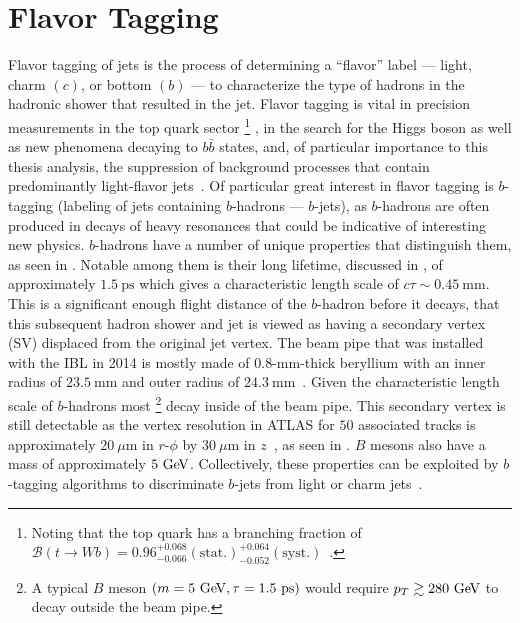 \clearpage
\section{Flavor Tagging}\label{section:flavor_tagging}

Flavor tagging of jets is the process of determining a ``flavor'' label --- light, charm $(c)$, or bottom $(b)$ --- to characterize the type of hadrons in the hadronic shower that resulted in the jet.
Flavor tagging is vital in precision measurements in the top quark sector%
\footnote{Noting that the top quark has a branching fraction of $\mathcal{B}\left(t \to W b\right) = 0.96_{-0.066}^{+0.068}\left(\mathrm{stat.}\right)_{-0.052}^{+0.064}\left(\mathrm{syst.}\right)$~\cite{Abazov:2010tm,PhysRevD.98.030001}.}%
, in the search for the Higgs boson as well as new phenomena decaying to $b\bar{b}$ states, and, of particular importance to this thesis analysis, the suppression of background processes that contain predominantly light-flavor jets~\cite{PERF-2012-04}.
Of particular great interest in flavor tagging is $b$-tagging (labeling of jets containing $b$-hadrons --- $b$-jets), as $b$-hadrons are often produced in decays of heavy resonances that could be indicative of interesting new physics.
$b$-hadrons have a number of unique properties that distinguish them, as seen in .
Notable among them is their long lifetime, discussed in , of approximately $1.5~\mathrm{ps}$ which gives a characteristic length scale of $c\tau \sim 0.45~\mathrm{mm}$.
This is a significant enough flight distance of the $b$-hadron before it decays, that this subsequent hadron shower and jet is viewed as having a secondary vertex (SV) displaced from the original jet vertex.
The beam pipe that was installed with the \gls{IBL} in 2014 is mostly made of $0.8$-mm-thick beryllium with an inner radius of $23.5~\mathrm{mm}$ and outer radius of $24.3~\mathrm{mm}$~\cite{PERF-2015-07}.
Given the characteristic length scale of $b$-hadrons most%
\footnote{A typical $B$ meson $\left(m = 5~\text{Ge\kern-0.1em V}, \tau = 1.5~\mathrm{ps}\right)$ would require $p_{T} \gtrsim 280~\text{Ge\kern-0.1em V}$ to decay outside the beam pipe.}
decay inside of the beam pipe.
This secondary vertex is still detectable as the vertex resolution in ATLAS for $50$ associated tracks is approximately $20~\mu\mathrm{m}$ in $r$-$\phi$ by $30~\mu\mathrm{m}$ in $z$~\cite{Choi:2271033,ATL-PHYS-PUB-2015-026}, as seen in .
$B$ mesons also have a mass of approximately $5~\text{Ge\kern-0.1em V}$.
Collectively, these properties can be exploited by $b$-tagging algorithms to discriminate $b$-jets from light or charm jets~\cite{ATL-PHYS-PUB-2015-022,ATL-PHYS-PUB-2016-012,ATL-PHYS-PUB-2017-013,PERF-2016-05}.

